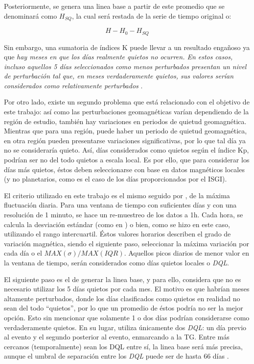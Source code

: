 Posteriormente, se genera una linea base a partir de este promedio que se denominará como $H_{SQ}$, la cual será restada de la serie de tiempo original o:
\vspace{1 em}

\begin{equation}
\label{eq:lineabase}
    H- H_0-H_{SQ}
\end{equation}

Sin embargo, una sumatoria de índices K puede llevar a un resultado engañoso ya que \textit{hay meses en que los días realmente quietos no ocurren. En estos casos, incluso aquellos 5 días seleccionados como menos perturbados presentan un nivel de perturbación tal que, en meses verdaderamente quietos, sus valores serían considerados como relativamente perturbados} \cite{BARTELS_kp}.
\vspace{1 em}

Por otro lado, existe un segundo problema que está relacionado con el objetivo de este trabajo: así como las perturbaciones geomagnéticas varían dependiendo de la región de estudio, también hay variaciones en periodos de quietud geomagnética. Mientras que para una región, puede haber un periodo de quietud geomagnética, en otra región pueden presentarse variaciones significativas, por lo que tal día ya no se consideraría quieto. Así, días considerados como quietos según el índice Kp, podrían ser no del todo quietos a escala local. Es por ello, que para considerar los días más quietos, éstos deben seleccionarse con base en datos magnéticos locales (y no planetarios, como es el caso de los días proporcionados por el ISGI). 
\vspace{1 em}

El criterio utilizado en este trabajo es el mismo seguido por \cite{baseline_Gjerloev, vanKampt}, de la máxima fluctuación diaria. Para una ventana de tiempo con suficientes días y con una resolución de 1 minuto, se hace un re-muestreo de los datos a 1h. Cada hora, se calcula la desviación estándar (como en \cite{vanKampt}) o bien, como se hizo en este caso, utilizando el rango intercuartil. Éstos valores horarios describen el grado de variación magnética, siendo el siguiente paso, seleccionar la máxima variación por cada día o el $MAX(\sigma)/MAX(IQR)$. Aquellos picos diarios de menor valor en la ventana de tiempo, serán considerados como días quietos locales o \emph{DQL}.
\vspace{1 em}

El siguiente paso es el de generar la linea base, y para ello, \cite{vanKampt} considera que no es necesario utilizar los 5 días quietos por cada mes. El motivo es que habrían meses altamente perturbados, donde los días clasificados como quietos en realidad no sean del todo ``quietos'', por lo que un promedio de éstos podría no ser la mejor opción. Esto sin mencionar que solamente 1 o dos días podrían considerarse como verdaderamente quietos. En su lugar, \cite{vanKampt} utiliza únicamente dos \emph{DQL}: un día previo al evento y el segundo posterior al evento, enmarcando a la TG. Entre más cercanos (temporalmente) sean los DQL entre sí, la linea base será más precisa, aunque el umbral de separación entre los \emph{DQL} puede ser de hasta 66 días \cite{vanKampt}.
\vspace{1 em}

